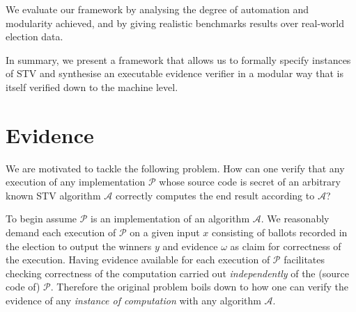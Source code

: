 \documentclass[10pt,conference]{IEEEtran}
\begin{document}

We evaluate our framework by analysing the degree of automation and modularity achieved, and by giving realistic benchmarks results over real-world election data.

In summary, we present a framework that allows us to formally specify instances of STV and synthesise an executable evidence verifier in a modular way that is itself verified down to the machine level.
\section{Evidence}
\label{sec:DataEv}
  
We are motivated to 
tackle the following problem. How can one verify that any execution of any implementation $\mathcal{P}$ whose source code is secret of an arbitrary  known STV algorithm $\mathcal{A}$ correctly computes the end result according to  $\mathcal{A}$?  



To begin 
assume $\mathcal{P}$ is an implementation of an algorithm $\mathcal{A}$. We reasonably demand each execution of $\mathcal{P}$ on a given input $x$ consisting of ballots recorded in the election to output the winners $y$ and evidence $\omega$ as claim  for correctness of the execution.  
 Having evidence available for each execution of $\mathcal{P}$ facilitates checking correctness of the computation carried out \emph{independently} of the (source code of) $\mathcal{P}$. Therefore the original problem boils down to how one can verify the evidence of any \emph{instance of computation} with any algorithm $\mathcal{A}$.
\end{document}
